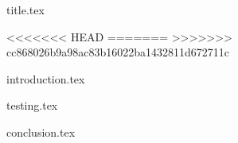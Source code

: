 \documentclass[a4paper,12pt]{article}
\begin{document}
{title.tex}

\newpage

\newpage
\vfill
\tableofcontents
<<<<<<< HEAD
\vfill
\newpage
=======
>>>>>>> cc868026b9a98ac83b16022ba1432811d672711c
\listoffigures

\newpage
{}

{introduction.tex}




{testing.tex}

{conclusion.tex}
\end{document}
